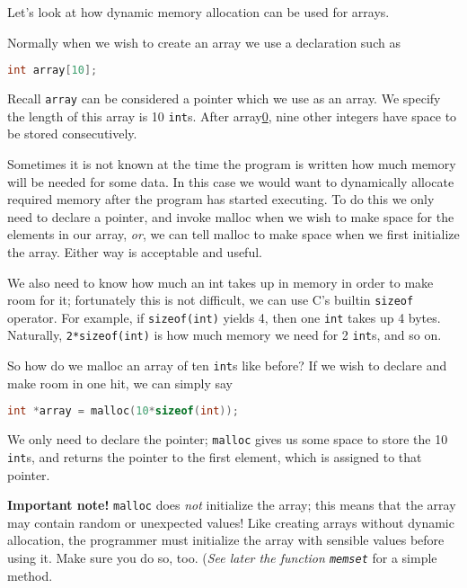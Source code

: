 Let's look at how dynamic memory allocation can be used for arrays.

Normally when we wish to create an array we use a declaration such as
\lstset{basicstyle=\scriptsize, numbers=left, captionpos=b, tabsize=4}
\begin{lstlisting}[caption=Section \thesection listing \arabic{memcnt},language={C},
breaklines=true,xleftmargin=15pt,label=lst:section\thesection listing\arabic{memcnt}]
int array[10];
\end{lstlisting}

Recall \texttt{array} can be considered a pointer which we use as an array. We
specify the length of this array is 10 \texttt{int}s. After array\url{0}, nine
other integers have space to be stored consecutively.

Sometimes it is not known at the time the program is written how much memory
will be needed for some data. In this case we would want to dynamically
allocate required memory after the program has started executing.  To do this
we only need to declare a pointer, and invoke malloc when we wish to make space
for the elements in our array, \emph{or}, we can tell malloc to make space when
we first initialize the array. Either way is acceptable and useful.

We also need to know how much an int takes up in memory in order to make room
for it; fortunately this is not difficult, we can use C's builtin
\texttt{sizeof} operator. For example, if \texttt{sizeof(int)} yields 4, then
one \texttt{int} takes up 4 bytes. Naturally, \texttt{2*sizeof(int)} is how
much memory we need for 2 \texttt{int}s, and so on.

So how do we malloc an array of ten \texttt{int}s like before? If we wish to
declare and make room in one hit, we can simply say
\lstset{basicstyle=\scriptsize, numbers=left, captionpos=b, tabsize=4}
\begin{lstlisting}[caption=Section \thesection listing \arabic{memcnt},language={C},
breaklines=true,xleftmargin=15pt,label=lst:section\thesection listing\arabic{memcnt}]
int *array = malloc(10*sizeof(int));
\end{lstlisting}

We only need to declare the pointer; \texttt{malloc} gives us some space to
store the 10 \texttt{int}s, and returns the pointer to the first element, which
is assigned to that pointer.

\textbf{Important note!} \texttt{malloc} does \emph{not} initialize the array;
this means that the array may contain random or unexpected values! Like
creating arrays without dynamic allocation, the programmer must initialize the
array with sensible values before using it. Make sure you do so, too.
(\emph{See later the function \texttt{memset}} for a simple method.

